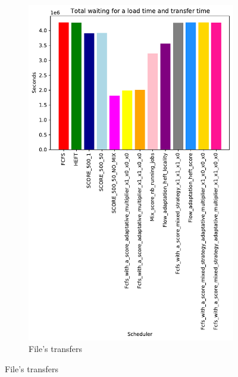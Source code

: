 \documentclass[a4paper]{article}
\begin{document}
\begin{figure}[H]
\begin{subfigure}[b]{0.4\linewidth}\centering\includegraphics[width=0.9\linewidth]{MBSS/plot/Results_FCFS_Score_Adaptative_Multiplier_2022-01-17->2022-01-17_V9271_Total_waiting_for_a_load_time_and_transfer_time_450_128_32_256_4_1024.pdf}\caption{File's transfers}\end{subfigure}

\end{figure}
\end{document}
